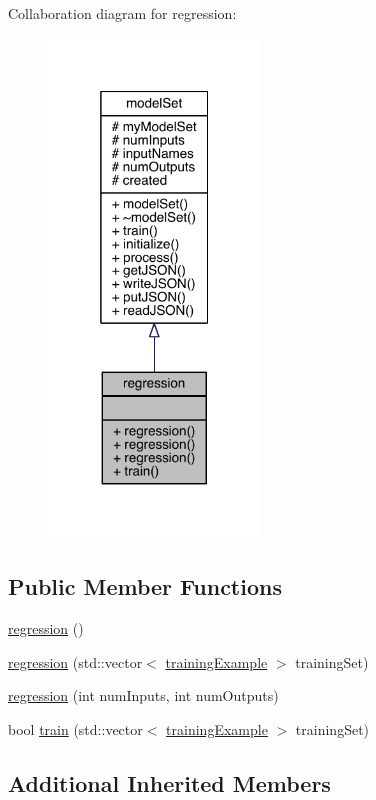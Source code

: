 Collaboration diagram for regression\+:
\nopagebreak
\begin{figure}[H]
\begin{center}
\leavevmode
\includegraphics[width=160pt]{classregression__coll__graph}
\end{center}
\end{figure}
\subsection*{Public Member Functions}
\begin{DoxyCompactItemize}
\item 
\hyperlink{classregression_a40993153659b1f637cf4d596df6e97ab}{regression} ()
\item 
\hyperlink{classregression_ad03f74e09d96f315de3933628e8f4138}{regression} (std\+::vector$<$ \hyperlink{structtraining_example}{training\+Example} $>$ training\+Set)
\item 
\hyperlink{classregression_a9d38dcda0e5c99caf0faf85f98a5ebb3}{regression} (int num\+Inputs, int num\+Outputs)
\item 
bool \hyperlink{classregression_ae45d7dbf24cab75202d966d116829813}{train} (std\+::vector$<$ \hyperlink{structtraining_example}{training\+Example} $>$ training\+Set)
\end{DoxyCompactItemize}
\subsection*{Additional Inherited Members}


